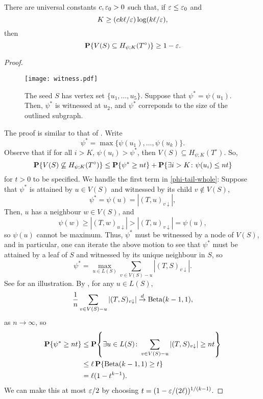 \begin{prop}
  There are universal constants $c, \varepsilon_0 > 0$ such that, if
  $\varepsilon \le \varepsilon_0$ and 
  \[
    K \ge (c k \ell/\varepsilon) \log (k \ell/\varepsilon) ,
  \]
  then
  \[
    \operatorname{\mathbf{P}}\{V(S) \subseteq H_{\psi; K}(T^\circ)\} \ge 1 - \varepsilon .
  \]
\end{prop}
\begin{proof}
  \begin{figure}
    \centering
    \texttt{[image: witness.pdf]}
    \caption{The seed $S$ has vertex set $\{u_1, \dots,
      u_5\}$. Suppose that $\psi^* = \psi(u_1)$. Then, $\psi^*$ is
      witnessed at $u_2$, and $\psi^*$ correponds to the size of the
      outlined subgraph.}
  \end{figure}
  The proof is similar to that of . Write
  \[
    \psi^* = \max\{\psi(u_1), \dots, \psi(u_k)\} .
  \]
  Observe that if for all $i > K$, $\psi(u_i) > \psi^*$, then
  $V(S) \subseteq H_{\psi; K}(T^\circ)$. So,
  \begin{equation}
    \Pr\{V(S) \not\subseteq H_{\psi; K}(T^\circ)\} \le \Pr\{\psi^* \ge n t \} + \Pr\{\exists i > K \colon \psi(u_i) \le n t\} \eqlabel{phi-tail-whole}
  \end{equation}
  for $t > 0$ to be specified. We handle the first term in
  \eqref{phi-tail-whole}: Suppose that $\psi^*$ is attained by
  $u \in V(S)$ and witnessed by its child $v \not\in V(S)$, \ie
  \[
    \psi^* = \psi(u) = |(T, u)_{v \downarrow}| ,
  \]
  Then, $u$ has a neighbour $w \in V(S)$, and
  \[
    \psi(w) \ge |(T, w)_{u \downarrow}| > |(T, u)_{v \downarrow}| = \psi(u) ,
  \]
  so $\psi(u)$ cannot be maximum. Thus, $\psi^*$ must be witnessed by
  a node of $V(S)$, and in particular, one can iterate the above
  motion to see that $\psi^*$ must be attained by a leaf of $S$ and
  witnessed by its unique neighbour in $S$, so
  \[
    \psi^* = \max_{u \in L(S)} \sum_{v \in V(S) - u} |(T, S)_{v \downarrow}| .
  \]
  See  for an illustration. By
  , for any $u \in L(S)$,
  \[
    \frac{1}{n} \sum_{v \in V(S) - u} |(T, S)_{v \downarrow}| \overset{d}{\to} \operatorname{Beta}(k - 1, 1) ,
  \]
  as $n \to \infty$, so
  \begin{align*}
    \Pr\{\psi^* \ge nt\} &\le \Pr\left\{\exists u \in L(S) \colon \sum_{v \in V(S) - u} |(T, S)_{v \downarrow}| \ge n t \right\} \\
                         &\le \ell \Pr\{\Beta(k - 1, 1) \ge t\} \\
                         &= \ell (1 - t^{k - 1}) .
  \end{align*}
  We can make this at most $\varepsilon/2$ by choosing
  $t = (1 - \varepsilon/(2\ell))^{1/(k - 1)}$.


\end{proof}
